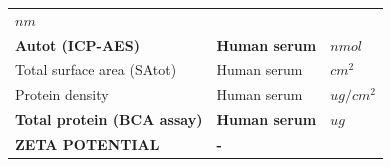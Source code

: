 \documentclass[utf8]{frontiersHLTH} %
\begin{document}
\begin{longtable}[]{@{}lll@{}}
\begin{minipage}[t]{0.13\columnwidth}
\(nm\)\strut
\end{minipage}\tabularnewline
\begin{minipage}[t]{0.58\columnwidth}\raggedright\strut
\textbf{Autot (ICP-AES)}\strut
\end{minipage} & \begin{minipage}[t]{0.20\columnwidth}\raggedright\strut
\textbf{Human serum}\strut
\end{minipage} & \begin{minipage}[t]{0.13\columnwidth}\raggedright\strut
\(nmol\)\strut
\end{minipage}\tabularnewline
\begin{minipage}[t]{0.58\columnwidth}\raggedright\strut
Total surface area (SAtot)\strut
\end{minipage} & \begin{minipage}[t]{0.20\columnwidth}\raggedright\strut
Human serum\strut
\end{minipage} & \begin{minipage}[t]{0.13\columnwidth}\raggedright\strut
\(cm^2\)\strut
\end{minipage}\tabularnewline
\begin{minipage}[t]{0.58\columnwidth}\raggedright\strut
Protein density\strut
\end{minipage} & \begin{minipage}[t]{0.20\columnwidth}\raggedright\strut
Human serum\strut
\end{minipage} & \begin{minipage}[t]{0.13\columnwidth}\raggedright\strut
\(ug/cm^2\)\strut
\end{minipage}\tabularnewline
\begin{minipage}[t]{0.58\columnwidth}\raggedright\strut
\textbf{Total protein (BCA assay)}\strut
\end{minipage} & \begin{minipage}[t]{0.20\columnwidth}\raggedright\strut
\textbf{Human serum}\strut
\end{minipage} & \begin{minipage}[t]{0.13\columnwidth}\raggedright\strut
\(ug\)\strut
\end{minipage}\tabularnewline
\begin{minipage}[t]{0.58\columnwidth}\raggedright\strut
\textbf{ZETA POTENTIAL}\strut
\end{minipage} & \begin{minipage}[t]{0.20\columnwidth}\raggedright\strut
\textbf{-}\strut
\end{minipage} & \begin{minipage}[t]{0.13\columnwidth}\raggedright\strut

\end{minipage}
\end{longtable}
\end{document}
